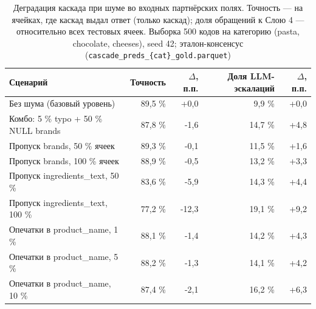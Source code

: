 \begin{table}[h!]
\centering
\caption{Деградация каскада при шуме во входных партнёрских полях. Точность — на ячейках, где каскад выдал ответ (только каскад); доля обращений к Слою 4 — относительно всех тестовых ячеек. Выборка 500 кодов на категорию (pasta, chocolate, cheeses), seed 42; эталон-консенсус (\texttt{cascade\_preds\_\{cat\}\_gold.parquet})}
\label{tab:input_robustness}
{\footnotesize\setlength{\tabcolsep}{4pt}
\begin{tabular}{lrrrr}
\toprule
Сценарий & Точность & $\Delta$, п.п. & Доля LLM-эскалаций & $\Delta$, п.п. \\
\midrule
Без шума (базовый уровень) & 89,5 \% & +0,0 & 9,9 \% & +0,0 \\
Комбо: 5 \% typo + 50 \% NULL brands & 87,8 \% & -1,6 & 14,7 \% & +4,8 \\
Пропуск brands, 50 \% ячеек & 89,3 \% & -0,1 & 11,5 \% & +1,6 \\
Пропуск brands, 100 \% ячеек & 88,9 \% & -0,5 & 13,2 \% & +3,3 \\
Пропуск ingredients\_text, 50 \% & 83,6 \% & -5,9 & 14,3 \% & +4,4 \\
Пропуск ingredients\_text, 100 \% & 77,2 \% & -12,3 & 19,1 \% & +9,2 \\
Опечатки в product\_name, 1 \% & 88,1 \% & -1,4 & 14,2 \% & +4,3 \\
Опечатки в product\_name, 5 \% & 88,2 \% & -1,3 & 14,1 \% & +4,2 \\
Опечатки в product\_name, 10 \% & 87,4 \% & -2,1 & 16,2 \% & +6,3 \\
\bottomrule
\end{tabular}
}
\end{table}
